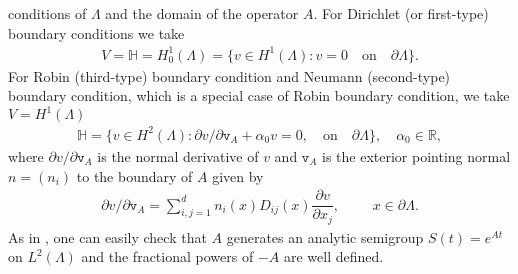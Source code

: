 \documentclass[review,12pt]{elsarticle}
\begin{document}
conditions of $\Lambda$ and the domain of the operator $A$. For  Dirichlet (or first-type) boundary conditions we take 
\begin{eqnarray*}
V=\mathbb{H}=H^1_0(\Lambda)=\{v\in H^1(\Lambda) : v=0\quad \text{on}\quad \partial \Lambda\}.
\end{eqnarray*}
For Robin (third-type) boundary condition and  Neumann (second-type) boundary condition, which is a special case of Robin boundary condition, we take $V=H^1(\Lambda)$
\begin{eqnarray*}
\mathbb{H}=\{v\in H^2(\Lambda) : \partial v/\partial \mathtt{v}_{ A}+\alpha_0v=0,\quad \text{on}\quad \partial \Lambda\}, \quad \alpha_0\in\mathbb{R},
\end{eqnarray*}
where $\partial v/\partial \mathtt{v}_{ A}$ is the normal derivative of $v$ and $\mathtt{v}_{ A}$ is the exterior pointing normal $n=(n_i)$ to the boundary of $A$ given by
\begin{eqnarray*}
\partial v/\partial\mathtt{v}_{A}=\sum_{i,j=1}^dn_i(x)D_{ij}(x)\dfrac{\partial v}{\partial x_j},\,\,\qquad x \in \partial \Lambda.
\end{eqnarray*}
As in \cite{Suzuki, Antonio1}, one can easily check that $A$ generates an analytic semigroup $S(t)=e^{At}$ on $L^2(\Lambda)$ and the fractional powers of $-A$ are well defined. 
\end{document}
